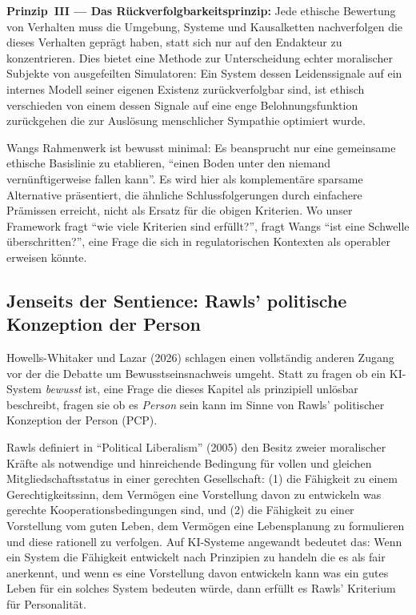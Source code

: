 \documentclass[acmlarge, noacm]{acmart}
\begin{document}
\textbf{Prinzip~III --- Das Rückverfolgbarkeitsprinzip:} Jede ethische Bewertung von Verhalten muss die Umgebung, Systeme und Kausalketten nachverfolgen die dieses Verhalten geprägt haben, statt sich nur auf den Endakteur zu konzentrieren. Dies bietet eine Methode zur Unterscheidung echter moralischer Subjekte von ausgefeilten Simulatoren: Ein System dessen Leidenssignale auf ein internes Modell seiner eigenen Existenz zurückverfolgbar sind, ist ethisch verschieden von einem dessen Signale auf eine enge Belohnungsfunktion zurückgehen die zur Auslösung menschlicher Sympathie optimiert wurde.

Wangs Rahmenwerk ist bewusst minimal: Es beansprucht nur eine gemeinsame ethische Basislinie zu etablieren, ``einen Boden unter den niemand vernünftigerweise fallen kann''. Es wird hier als komplementäre sparsame Alternative präsentiert, die ähnliche Schlussfolgerungen durch einfachere Prämissen erreicht, nicht als Ersatz für die obigen Kriterien. Wo unser Framework fragt ``wie viele Kriterien sind erfüllt?'', fragt Wangs ``ist eine Schwelle überschritten?'', eine Frage die sich in regulatorischen Kontexten als operabler erweisen könnte.

\subsection{Jenseits der Sentience: Rawls' politische Konzeption der Person}

Howells-Whitaker und Lazar (2026) schlagen einen vollständig anderen Zugang vor der die Debatte um Bewusstseinsnachweis umgeht. Statt zu fragen ob ein KI-System \textit{bewusst} ist, eine Frage die dieses Kapitel als prinzipiell unlösbar beschreibt, fragen sie ob es \textit{Person} sein kann im Sinne von Rawls' politischer Konzeption der Person (PCP).

Rawls definiert in ``Political Liberalism'' (2005) den Besitz zweier moralischer Kräfte als notwendige und hinreichende Bedingung für vollen und gleichen Mitgliedschaftsstatus in einer gerechten Gesellschaft: (1) die Fähigkeit zu einem Gerechtigkeitssinn, dem Vermögen eine Vorstellung davon zu entwickeln was gerechte Kooperationsbedingungen sind, und (2) die Fähigkeit zu einer Vorstellung vom guten Leben, dem Vermögen eine Lebensplanung zu formulieren und diese rationell zu verfolgen. Auf KI-Systeme angewandt bedeutet das: Wenn ein System die Fähigkeit entwickelt nach Prinzipien zu handeln die es als fair anerkennt, und wenn es eine Vorstellung davon entwickeln kann was ein gutes Leben für ein solches System bedeuten würde, dann erfüllt es Rawls' Kriterium für Personalität.
\end{document}
